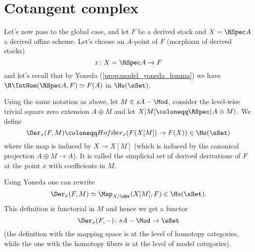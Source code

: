    \section{Cotangent complex}
        Let's now pass to the global case, and let $F$ be a derived stack and $X = \RSpec A$ a derived affine scheme. Let's choose an $A$-point of $F$ (morphism of derived stacks) \[x\colon X = \RSpec A \to F \] and let's recall that by Yoneda (\cref{prop:model_yoneda_lemma}) we have $\R\IntHom(\RSpec A, F) \simeq F(A)$ in $\Ho(\sSet)$. 
        \begin{defn}
            \label{defn:derived_derivations_global}
            Using the same notation as above, let $M \in sA-\Mod$,  consider the level-wise trivial square zero extension $A \oplus M$ and let $X[M] \coloneqq \RSpec(A \oplus M)$. We define \[\Der_x(F, M) \coloneqq Hofiber_x(F(X[M]) \to F(X)) \in \Ho(\sSet) \] where the map is induced by $X \to X[M]$ (which is induced by the canonical projection $A \oplus M \to A$). It is called the simplicial set of derived derivations of $F$ at the point $x$ with coefficients in $M$.
        \end{defn}
        Using Yoneda one can rewrite \[\Der_x(F, M) \simeq \Map_{X/\dSt}(X[M], F) \in \Ho(\sSet). \]  This definition is functorial in $M$ and hence we get a functor \[\Der_x(F, -)\colon sA-\Mod \to \sSet \] (the definition with the mapping space is at the level of homotopy categories, while the one with the homotopy fibers is at the level of model categories).
        
